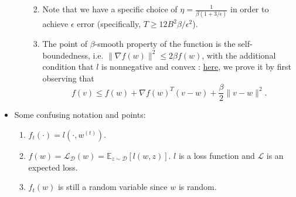 \documentclass[11pt,reqno]{amsart}
\theoremstyle{remark}
\begin{document}
\begin{itemize}
\begin{enumerate}
\begin{enumerate}
\[\]
\item Note that we have a specific choice of $\eta=\frac 1{\beta(1+3/\epsilon)}$ in order to achieve $\epsilon$ error (specifically, $T\geq 12B^2\beta/\epsilon^2$).
\item The point of $\beta$-smooth property of the function is the self-boundedness, i.e. $\lVert\nabla f(w)\rVert^2\leq 2\beta f(w)$, 
with the additional condition that $l$ is nonnegative and convex
: \href{chrome-extension://efaidnbmnnnibpcajpcglclefindmkaj/https://www.eecis.udel.edu/~xwu/class/ELEG867/Lecture9.pdf}{here}, we prove it by first observing 
that 
\[
f(v)\leq f(w)+\nabla f(w)^T(v-w)+\frac{\beta}2 \lVert v-w\rVert^2.
\]
\end{enumerate}
\end{enumerate}
\item Some confusing notation and points: 
\begin{enumerate}
\item $f_t(\cdot)=l(\cdot, w^{(t)})$.
\item $f(w)=\mathcal{L}_{\mathcal{D}}(w)=\mathbb{E}_{z\sim\mathcal{D}}[l(w,z)]$. 
$l$ is a loss function and $\mathcal{L}$ is an expected loss.
\item $f_t(w)$ is still a random variable since $w$ is random.
\end{enumerate}
\end{itemize}
\end{document}
